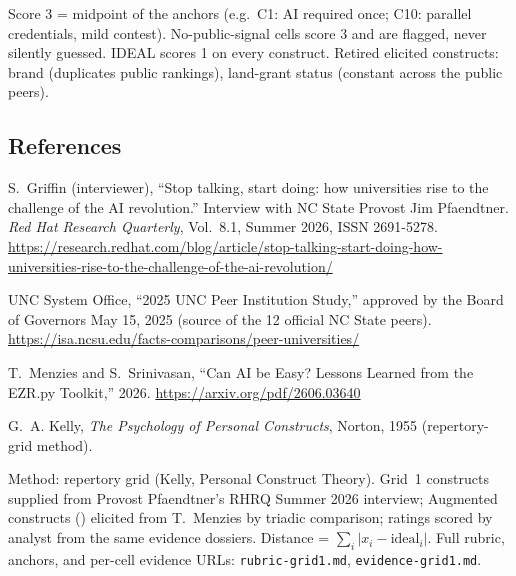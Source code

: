 \documentclass[11pt]{article}
\begin{document}
\vspace{6pt}
{\color{inkgray}\footnotesize Score 3 = midpoint of the anchors (e.g.\ C1: AI required once; C10: parallel credentials, mild contest). No-public-signal cells score 3 and are flagged, never silently guessed. IDEAL scores 1 on every construct. Retired elicited constructs: brand (duplicates public rankings), land-grant status (constant across the public peers).}

\subsection*{References}
\begin{enumerate}[itemsep=2pt,label={[\arabic*]}]
\item S.~Griffin (interviewer), ``Stop talking, start doing: how universities rise to the challenge of the AI revolution.'' Interview with NC State Provost Jim Pfaendtner. \emph{Red Hat Research Quarterly}, Vol.~8.1, Summer 2026, ISSN 2691-5278. \url{https://research.redhat.com/blog/article/stop-talking-start-doing-how-universities-rise-to-the-challenge-of-the-ai-revolution/}
\item UNC System Office, ``2025 UNC Peer Institution Study,'' approved by the Board of Governors May 15, 2025 (source of the 12 official NC State peers). \url{https://isa.ncsu.edu/facts-comparisons/peer-universities/}
\item T.~Menzies and S.~Srinivasan, ``Can AI be Easy? Lessons Learned from the EZR.py Toolkit,'' 2026. \url{https://arxiv.org/pdf/2606.03640}
\item G.~A. Kelly, \emph{The Psychology of Personal Constructs}, Norton, 1955 (repertory-grid method).
\end{enumerate}

\vfill
{\color{inkgray}\footnotesize\sffamily Method: repertory grid (Kelly, Personal Construct Theory). Grid~1 constructs supplied from Provost Pfaendtner's RHRQ Summer 2026 interview; Augmented constructs (\dag) elicited from T.~Menzies by triadic comparison; ratings scored by analyst from the same evidence dossiers. Distance = $\sum_i |x_i - \mathrm{ideal}_i|$. Full rubric, anchors, and per-cell evidence URLs: \texttt{rubric-grid1.md}, \texttt{evidence-grid1.md}.\par}
\end{document}
